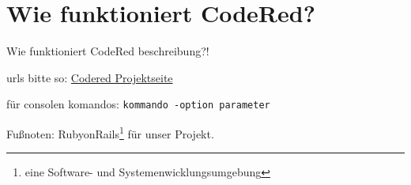 \chapter{Wie funktioniert CodeRed?}  %
\label{chapter:Wie funktioniert CodeRed?}  %

Wie funktioniert CodeRed beschreibung?!

urls bitte so:
\href{http://codered.berlios.de}{Codered Projektseite}


für consolen komandos:
\verb|kommando -option parameter|

Fußnoten:
RubyonRails\footnote{eine Software- und Systemenwicklungsumgebung} für unser Projekt.
